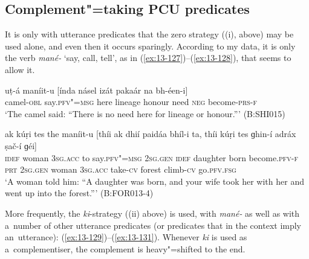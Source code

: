 \subsection{Complement"=taking PCU predicates}
\label{subsec:13-5-1}

 It is only with utterance predicates that the zero strategy ((i), above) may be used alone, and even then it occurs sparingly. According to my data, it is only the verb \textit{mané-} `say, call, tell', as in (\ref{ex:13-127})--(\ref{ex:13-128}), that seems to allow it.

\begin{exe}
\ex
\label{ex:13-127}
\gll uṭ-á maníit-u [índa násel izát pakaár  na bh-éen-i]  \\
camel-\textsc{obl}  say.\textsc{pfv"=msg} here lineage honour need  \textsc{neg} become-\textsc{prs-f} \\
\glt `The camel said: ``There is no need here for lineage or honour.''' (B:SHI015)

\ex
\label{ex:13-128}
\gll ak kúṛi tes the maníit-u [thíi ak  dhií paidáa bhíl-i ta, thíi
  kúṛi tes  ɡhin-í adráx ṣač-í ɡéi] \\
\textsc{idef} woman \textsc{3sg.acc} to say.\textsc{pfv"=msg} \textsc{2sg.gen} \textsc{idef}  daughter born become.\textsc{pfv-f} \textsc{prt} \textsc{2sg.gen} woman \textsc{3sg.acc}  take-\textsc{cv} forest climb-\textsc{cv} go.\textsc{pfv.fsg}  \\
\glt `A woman told him: ``A daughter was born, and your wife took her with her and went up into the forest.''' (B:FOR013-4) 
\end{exe}

More frequently, the \textit{ki}-strategy ((ii) above) is used, with \textit{mané-} as well as with a~number of other utterance predicates (or predicates that in the context imply an~utterance): (\ref{ex:13-129})--(\ref{ex:13-131}). Whenever \textit{ki} is used as a~complementiser, the complement is heavy"=shifted to the end.

